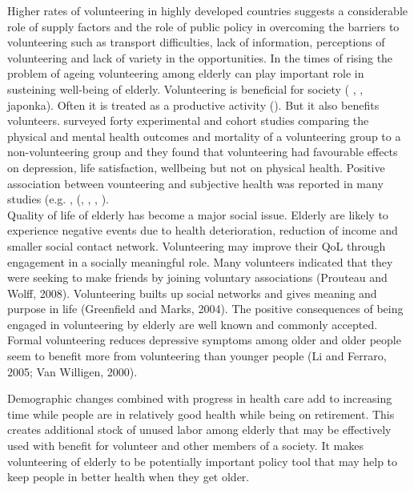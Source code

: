 \documentclass[10pt, letterpaper]{article}
\begin{document}
\begin{spacing}{1.4}
Higher rates of volunteering in  highly developed countries suggests a considerable role of supply factors and the role of public policy in overcoming the barriers to volunteering such as transport difficulties, lack of information, perceptions of volunteering and lack of variety in the opportunities. In the times of rising the problem of ageing volunteering among elderly can play important role in susteining well-being of elderly. Volunteering is beneficial for society ( \citet{Oecd15}, \cite{prouteau06}, japonka). Often it is treated as a productive activity (\citet{hank09}). But it also benefits volunteers. \citet{jenkinson2013volunteering} surveyed forty experimental and cohort studies comparing the physical and mental health outcomes and mortality of a volunteering group to a non-volunteering group and they found that volunteering had favourable effects on depression, life satisfaction, wellbeing but not on physical health. Positive association between vounteering and subjective health was reported in many studies (e.g. \citet{borgonovi08}, (\cite{anderson14}, \cite{li06}, \cite{VanWilligen00}, \citet{detollenaere17}). \\

Quality of life of elderly has become a major social issue. Elderly are likely to experience negative events due to health deterioration, reduction of income and smaller social contact network. Volunteering may improve their QoL through engagement in a socially meaningful role. Many volunteers indicated that they were seeking to make friends by joining voluntary associations (Prouteau and Wolff, 2008). Volunteering builts up social networks and gives meaning and purpose in life (Greenfield and Marks, 2004). The positive consequences of being engaged in volunteering by elderly are well known and commonly accepted. Formal volunteering reduces depressive symptoms among older and older people seem to benefit more
from volunteering than younger people (Li and Ferraro, 2005; Van Willigen, 2000).

 Demographic changes combined with progress in health care add to increasing time while people are in relatively good health while being on retirement. This creates additional  stock of unused labor among elderly that may be effectively used with benefit for volunteer and other members of a society.  It makes   volunteering of elderly to be potentially important policy tool that may help to keep people in better health when they get older. \\


\end{spacing}
\end{document}
